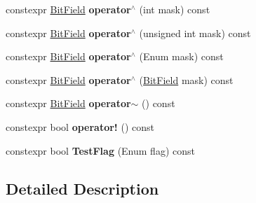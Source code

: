 \begin{DoxyCompactItemize}
\item 
constexpr \hyperlink{classHatchit_1_1Core_1_1BitField}{Bit\+Field} {\bfseries operator$^\wedge$} (int mask) const \hypertarget{classHatchit_1_1Core_1_1BitField_ac9d409b63f45de94ddff7a2e598699d5}{}\label{classHatchit_1_1Core_1_1BitField_ac9d409b63f45de94ddff7a2e598699d5}

\item 
constexpr \hyperlink{classHatchit_1_1Core_1_1BitField}{Bit\+Field} {\bfseries operator$^\wedge$} (unsigned int mask) const \hypertarget{classHatchit_1_1Core_1_1BitField_a5ce2b4a9e8e84f1a6f6733575c637a0d}{}\label{classHatchit_1_1Core_1_1BitField_a5ce2b4a9e8e84f1a6f6733575c637a0d}

\item 
constexpr \hyperlink{classHatchit_1_1Core_1_1BitField}{Bit\+Field} {\bfseries operator$^\wedge$} (Enum mask) const \hypertarget{classHatchit_1_1Core_1_1BitField_ae258c581845a5903beab676594723fa1}{}\label{classHatchit_1_1Core_1_1BitField_ae258c581845a5903beab676594723fa1}

\item 
constexpr \hyperlink{classHatchit_1_1Core_1_1BitField}{Bit\+Field} {\bfseries operator$^\wedge$} (\hyperlink{classHatchit_1_1Core_1_1BitField}{Bit\+Field} mask) const \hypertarget{classHatchit_1_1Core_1_1BitField_aa35d9f59c7380a01ee6c42f01dd744ac}{}\label{classHatchit_1_1Core_1_1BitField_aa35d9f59c7380a01ee6c42f01dd744ac}

\item 
constexpr \hyperlink{classHatchit_1_1Core_1_1BitField}{Bit\+Field} {\bfseries operator$\sim$} () const \hypertarget{classHatchit_1_1Core_1_1BitField_a35cffc05996f702eb8179f5ed725ef7a}{}\label{classHatchit_1_1Core_1_1BitField_a35cffc05996f702eb8179f5ed725ef7a}

\item 
constexpr bool {\bfseries operator!} () const \hypertarget{classHatchit_1_1Core_1_1BitField_a37b7a2490f2b4aadc401b563d2a3dcc8}{}\label{classHatchit_1_1Core_1_1BitField_a37b7a2490f2b4aadc401b563d2a3dcc8}

\item 
constexpr bool {\bfseries Test\+Flag} (Enum flag) const \hypertarget{classHatchit_1_1Core_1_1BitField_a5614d8fe65946fe7f3ddada579210348}{}\label{classHatchit_1_1Core_1_1BitField_a5614d8fe65946fe7f3ddada579210348}

\end{DoxyCompactItemize}


\subsection{Detailed Description}

